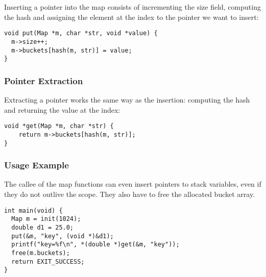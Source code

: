     Inserting a pointer into the map consists of incrementing the size field,
    computing the hash and assigning the element at the index to the pointer we
    want to insert:

    \begin{verbatim}
void put(Map *m, char *str, void *value) {
  m->size++;
  m->buckets[hash(m, str)] = value;
}
    \end{verbatim}

    \subsubsection*{Pointer Extraction}
    Extracting a pointer works the same way as the insertion: computing the
    hash and returning the value at the index:


    \begin{verbatim}
void *get(Map *m, char *str) {
    return m->buckets[hash(m, str)]; 
}
    \end{verbatim}

    \subsubsection*{Usage Example}

    The callee of the map functions can even insert pointers to stack
    variables, even if they do not outlive the scope. They also have
    to free the allocated bucket array.

    \begin{verbatim}
int main(void) {
  Map m = init(1024);
  double d1 = 25.0;
  put(&m, "key", (void *)&d1);
  printf("key=%f\n", *(double *)get(&m, "key"));
  free(m.buckets);
  return EXIT_SUCCESS;
}
    \end{verbatim}


